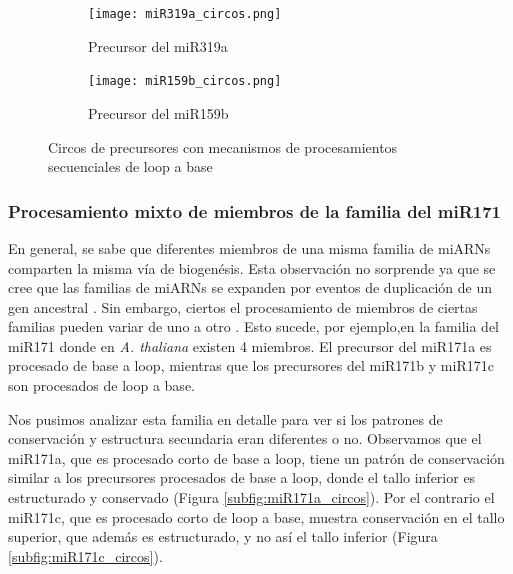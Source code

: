 \begin{landscape}
	\begin{figure}
	\centering
	\begin{subfigure}{.75\textwidth}
	  \centering
	  \texttt{[image: miR319a\_circos.png]}
	  \caption{Precursor del miR319a}
	  \label{subfig:miR319a_circos}
	\end{subfigure}%
	\begin{subfigure}{.75\textwidth}
	  \centering
	  \texttt{[image: miR159b\_circos.png]}
	  \caption{Precursor del miR159b}
	  \label{subfig:miR159b_circos}
	\end{subfigure}
	\caption{Circos de precursores con mecanismos de procesamientos secuenciales de loop a base}
	\label{fig:seqLTBL_circos}
	\end{figure}
\end{landscape}


\subsubsection{Procesamiento mixto de miembros de la familia del miR171}

En general, se sabe que diferentes miembros de una misma familia de miARNs comparten la misma vía de biogenésis. 
Esta observación no sorprende ya que se cree que las familias de miARNs se expanden por eventos de duplicación de un gen ancestral \citep{pmid15565108}.
Sin embargo, ciertos el procesamiento de miembros de ciertas familias pueden variar de uno a otro \citep{Bologna2013}.
Esto sucede, por ejemplo,en la familia del miR171 donde en \textit{A. thaliana} existen 4 miembros. 
El precursor del miR171a es procesado de base a loop, mientras que los precursores del miR171b y miR171c son procesados de loop a base.

Nos pusimos analizar esta familia en detalle para ver si los patrones de conservación y estructura secundaria eran diferentes o no.
Observamos que el miR171a, que es procesado corto de base a loop, tiene un patrón de conservación similar a los precursores procesados de base a loop, donde el tallo inferior es estructurado y conservado (Figura \ref{subfig:miR171a_circos}).
Por el contrario el miR171c, que es procesado corto de loop a base, muestra conservación en el tallo superior, que además es estructurado, y no así el tallo inferior (Figura \ref{subfig:miR171c_circos}).




